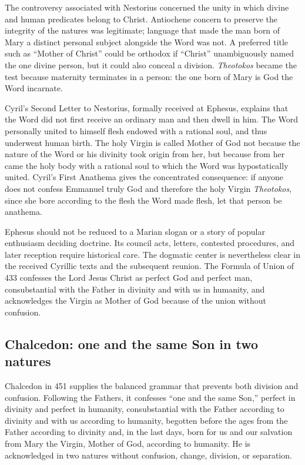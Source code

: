The controversy associated with Nestorius concerned the unity in which divine and human predicates belong to Christ. Antiochene concern to preserve the integrity of the natures was legitimate; language that made the man born of Mary a distinct personal subject alongside the Word was not. A preferred title such as ``Mother of Christ'' could be orthodox if ``Christ'' unambiguously named the one divine person, but it could also conceal a division. \emph{Theotokos} became the test because maternity terminates in a person: the one born of Mary is God the Word incarnate.

Cyril's Second Letter to Nestorius, formally received at Ephesus, explains that the Word did not first receive an ordinary man and then dwell in him. The Word personally united to himself flesh endowed with a rational soul, and thus underwent human birth. The holy Virgin is called Mother of God not because the nature of the Word or his divinity took origin from her, but because from her came the holy body with a rational soul to which the Word was hypostatically united. Cyril's First Anathema gives the concentrated consequence: if anyone does not confess Emmanuel truly God and therefore the holy Virgin \emph{Theotokos}, since she bore according to the flesh the Word made flesh, let that person be anathema.

Ephesus should not be reduced to a Marian slogan or a story of popular enthusiasm deciding doctrine. Its council acts, letters, contested procedures, and later reception require historical care. The dogmatic center is nevertheless clear in the received Cyrillic texts and the subsequent reunion. The Formula of Union of 433 confesses the Lord Jesus Christ as perfect God and perfect man, consubstantial with the Father in divinity and with us in humanity, and acknowledges the Virgin as Mother of God because of the union without confusion.

\subsection{Chalcedon: one and the same Son in two natures}

Chalcedon in 451 supplies the balanced grammar that prevents both division and confusion. Following the Fathers, it confesses ``one and the same Son,'' perfect in divinity and perfect in humanity, consubstantial with the Father according to divinity and with us according to humanity, begotten before the ages from the Father according to divinity and, in the last days, born for us and our salvation from Mary the Virgin, Mother of God, according to humanity. He is acknowledged in two natures without confusion, change, division, or separation.


